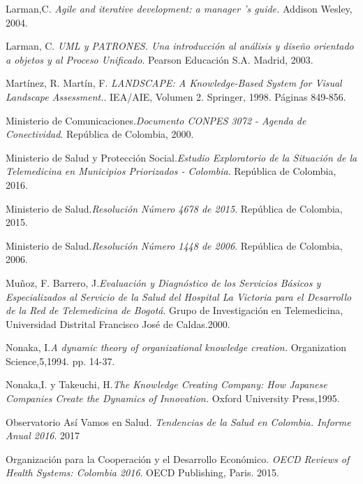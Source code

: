 \begin{thebibliography}{}
 Larman,C. \textit{Agile and iterative development: a manager ’s guide.} Addison Wesley, 2004.

 Larman, C. \textit{UML y PATRONES. Una introducción al análisis y diseño orientado a objetos y al Proceso Unificado}. Pearson Educación S.A. Madrid, 2003.

 Martínez, R. Martín, F. \textit{LANDSCAPE: A Knowledge-Based System for Visual Landscape Assessment.}. IEA/AIE, Volumen 2. Springer, 1998. Páginas 849-856.

 Ministerio de Comunicaciones.\textit{Documento CONPES 3072 - Agenda de Conectividad}. República de Colombia, 2000.

 Ministerio de Salud y Protección Social.\textit{Estudio Exploratorio de la Situación de la Telemedicina en Municipios Priorizados - Colombia}. República de Colombia, 2016.

 Ministerio de Salud.\textit{Resolución Número 4678 de 2015}. República de Colombia, 2015.

 Ministerio de Salud.\textit{Resolución Número 1448 de 2006}. República de Colombia, 2006.

 Muñoz, F. Barrero, J.\textit{Evaluación y Diagnóstico de los Servicios Básicos y Especializados al Servicio de la Salud del Hospital La Victoria para el Desarrollo de la Red de Telemedicina de Bogotá}. Grupo de Investigación en Telemedicina,  Universidad Distrital Francisco José de Caldas.2000.

 Nonaka, I.\textit{A dynamic theory of organizational knowledge creation.} Organization Science,5,1994. pp. 14-37.

 Nonaka,I. y Takeuchi, H.\textit{The Knowledge Creating Company: How Japanese Companies Create the Dynamics of Innovation.} Oxford University Press,1995.

 Observatorio Así Vamos en Salud. \textit{Tendencias de la Salud en Colombia. Informe Anual 2016}. 2017

 Organización para la Cooperación y el Desarrollo Económico. \textit{OECD Reviews of Health Systems: Colombia 2016}. OECD Publishing, Paris. 2015.


\end{thebibliography}
